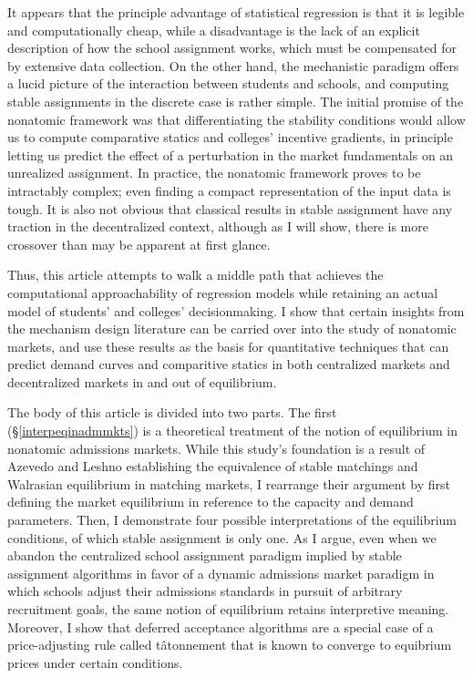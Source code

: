 \documentclass[12pt]{article}
\theoremstyle{definition}
\begin{document}
It appears that the principle advantage of statistical regression is that it is legible and computationally cheap, while a disadvantage is the lack of an explicit description of how the school assignment works, which must be compensated for by extensive data collection. On the other hand, the mechanistic paradigm offers a lucid picture of the interaction between students and schools, and computing stable assignments in the discrete case is rather simple. The initial promise of the nonatomic framework was that differentiating the stability conditions would allow us to compute comparative statics and colleges' incentive gradients, in principle letting us predict the effect of a perturbation in the market fundamentals on an unrealized assignment. In practice, the nonatomic framework proves to be intractably complex; even finding a compact representation of the input data is tough. It is also not obvious that classical results in stable assignment have any traction in the decentralized context, although as I will show, there is more crossover than may be apparent at first glance.

Thus, this article attempts to walk a middle path that achieves the computational approachability of regression models while retaining an actual model of students' and colleges' decisionmaking. I show that certain insights from the mechanism design literature can be carried over into the study of nonatomic markets, and use these results as the basis for quantitative techniques that can predict demand curves and comparitive statics in both centralized markets and decentralized markets in and out of equilibrium.

The body of this article is divided into two parts. The first (\S\ref{interpeqinadmmkts}) is a theoretical treatment of the notion of equilibrium in nonatomic admissions markets. While this study's foundation is a result of Azevedo and Leshno \parencite*{supplydemandfw} establishing the equivalence of stable matchings and Walrasian equilibrium in matching markets, I rearrange their argument by first defining the market equilibrium in reference to the capacity and demand parameters. Then, I demonstrate four possible interpretations of the equilibrium conditions, of which stable assignment is only one. As I argue, even when we abandon the centralized school assignment paradigm implied by stable assignment algorithms in favor of a dynamic admissions market paradigm in which schools adjust their admissions standards in pursuit of arbitrary recruitment goals, the same notion of equilibrium retains interpretive meaning. Moreover, I show that deferred acceptance algorithms are a special case of a price-adjusting rule called t\^{a}tonnement that is known to converge to equibrium prices under certain conditions.
\end{document}
